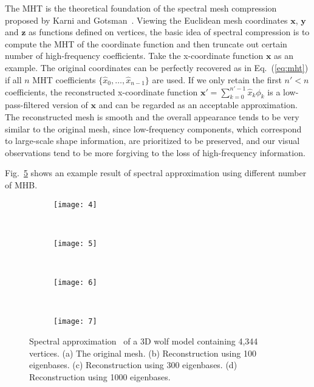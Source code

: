 The MHT is the theoretical foundation of the spectral mesh compression
proposed by Karni and Gotsman~\cite{Karni2000}. Viewing the
Euclidean mesh coordinates $\mathbf{x}$, $\mathbf{y}$ and $\mathbf{z}$
as functions defined on vertices, the basic idea of spectral
compression is to compute the MHT of the coordinate function and then
truncate out certain number of high-frequency coefficients. Take the
x-coordinate function $\mathbf{x}$ as an example. The original
coordinates can be perfectly recovered as in Eq.~(\ref{eq:mht}) if all
$n$ MHT coefficients $\{\widehat{x}_0,\ldots,\widehat{x}_{n-1}\}$ are
used. If we only retain the first $n'<n$ coefficients, the
reconstructed x-coordinate function $\mathbf{x'}=\sum_{k=0}^{n'-1}
\widehat{x}_k\phi_k$ is a low-pass-filtered version of $\mathbf{x}$
and can be regarded as an acceptable approximation. The reconstructed
mesh is smooth and the overall appearance tends to be very similar to
the original mesh, since low-frequency components, which correspond to
large-scale shape information, are prioritized to be preserved, and
our visual observations tend to be more forgiving to the loss of
high-frequency information.

Fig.~\ref{fig:fourier_approx} shows an example result of
spectral approximation using different number of MHB.
\begin{figure}
 \centering
 \begin{subfigure}[b]{0.23\linewidth}
  \texttt{[image: 4]}
  \caption{}
  \label{fig:fourier1}
 \end{subfigure}
 ~
 \begin{subfigure}[b]{0.23\linewidth}
  \texttt{[image: 5]}
  \caption{}
  \label{fig:fourier2}
 \end{subfigure}
 ~
 \begin{subfigure}[b]{0.23\linewidth}
  \texttt{[image: 6]}
  \caption{}
  \label{fig:fourier3}
 \end{subfigure}
 ~
 \begin{subfigure}[b]{0.23\linewidth}
  \texttt{[image: 7]}
  \caption{}
  \label{fig:fourier4}
 \end{subfigure}
 \caption[Spectral approximation of wolf model.]
 {Spectral approximation~\cite{Karni2000} of a 3D
  wolf model containing 4,344 vertices. (a) The original mesh. (b)
  Reconstruction using 100 eigenbases. (c) Reconstruction using 300
  eigenbases. (d) Reconstruction using 1000 eigenbases.}
 \label{fig:fourier_approx}
\end{figure}

